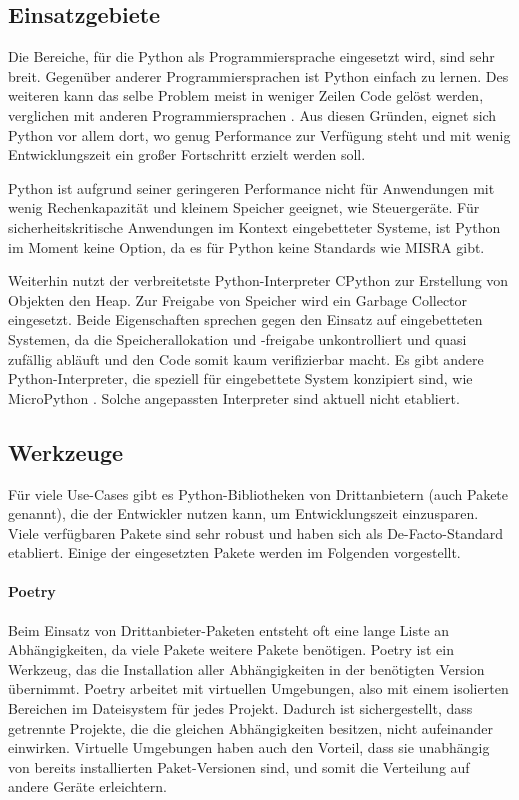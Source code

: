 	\subsection{Einsatzgebiete}		
		Die Bereiche, für die Python als Programmiersprache eingesetzt wird, sind sehr breit. Gegenüber anderer Programmiersprachen ist Python einfach zu lernen. \cite[vgl.][]{saabith2019python} Des weiteren kann das selbe Problem meist in weniger Zeilen Code gelöst werden, verglichen mit anderen Programmiersprachen \cite[vgl.][S. 100]{mcconnell2009code}.
		Aus diesen Gründen, eignet sich Python vor allem dort, wo genug Performance zur Verfügung steht und mit wenig Entwicklungszeit ein großer Fortschritt erzielt werden soll.
		
		Python ist aufgrund seiner geringeren Performance nicht für Anwendungen mit wenig Rechenkapazität und kleinem Speicher geeignet, wie Steuergeräte. Für sicherheitskritische Anwendungen im Kontext eingebetteter Systeme, ist Python im Moment keine Option, da es für Python keine Standards wie MISRA gibt.
		
		Weiterhin nutzt der verbreitetste Python-Interpreter CPython zur Erstellung von Objekten den Heap. Zur Freigabe von Speicher wird ein Garbage Collector eingesetzt. Beide Eigenschaften sprechen gegen den Einsatz auf eingebetteten Systemen, da die Speicherallokation und -freigabe unkontrolliert und quasi zufällig abläuft und den Code somit kaum verifizierbar macht. Es gibt andere Python-Interpreter, die speziell für eingebettete System konzipiert sind, wie MicroPython \cite[vgl.][]{george2018micropy}. Solche angepassten Interpreter sind aktuell nicht etabliert.
		
	\subsection{Werkzeuge}
		Für viele Use-Cases gibt es Python-Bibliotheken von Drittanbietern (auch Pakete genannt), die der Entwickler nutzen kann, um Entwicklungszeit einzusparen. Viele verfügbaren Pakete sind sehr robust und haben sich als De-Facto-Standard etabliert. Einige der eingesetzten Pakete werden im Folgenden vorgestellt.
		\paragraph{Poetry} Beim Einsatz von Drittanbieter-Paketen entsteht oft eine lange Liste an Abhängigkeiten, da viele Pakete weitere Pakete benötigen. Poetry ist ein Werkzeug, das die Installation aller Abhängigkeiten in der benötigten Version übernimmt. Poetry arbeitet mit virtuellen Umgebungen, also mit einem isolierten Bereichen im Dateisystem für jedes Projekt. Dadurch ist sichergestellt, dass getrennte Projekte, die die gleichen Abhängigkeiten besitzen, nicht aufeinander einwirken. Virtuelle Umgebungen haben auch den Vorteil, dass sie unabhängig von bereits installierten Paket-Versionen sind, und somit die Verteilung auf andere Geräte erleichtern.
		
